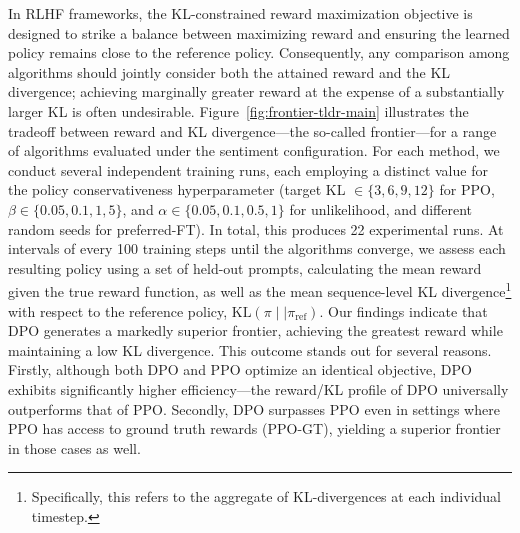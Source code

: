 In RLHF frameworks, the KL-constrained reward maximization objective is designed to strike a balance between maximizing reward and ensuring the learned policy remains close to the reference policy. Consequently, any comparison among algorithms should jointly consider both the attained reward and the KL divergence; achieving marginally greater reward at the expense of a substantially larger KL is often undesirable. Figure~\ref{fig:frontier-tldr-main} illustrates the tradeoff between reward and KL divergence—the so-called frontier—for a range of algorithms evaluated under the sentiment configuration. For each method, we conduct several independent training runs, each employing a distinct value for the policy conservativeness hyperparameter (target KL $\in\{3,6,9,12\}$ for PPO, $\beta \in \{0.05,0.1,1,5\}$, and $\alpha\in\{0.05,0.1,0.5,1\}$ for unlikelihood, and different random seeds for preferred-FT). In total, this produces 22 experimental runs. At intervals of every 100 training steps until the algorithms converge, we assess each resulting policy using a set of held-out prompts, calculating the mean reward given the true reward function, as well as the mean sequence-level KL divergence\footnote{Specifically, this refers to the aggregate of KL-divergences at each individual timestep.} with respect to the reference policy, $\text{KL}\left(\pi\mid \mid \pi_\text{ref}\right)$. Our findings indicate that DPO generates a markedly superior frontier, achieving the greatest reward while maintaining a low KL divergence. This outcome stands out for several reasons. Firstly, although both DPO and PPO optimize an identical objective, DPO exhibits significantly higher efficiency—the reward/KL profile of DPO universally outperforms that of PPO. Secondly, DPO surpasses PPO even in settings where PPO has access to ground truth rewards (PPO-GT), yielding a superior frontier in those cases as well.

